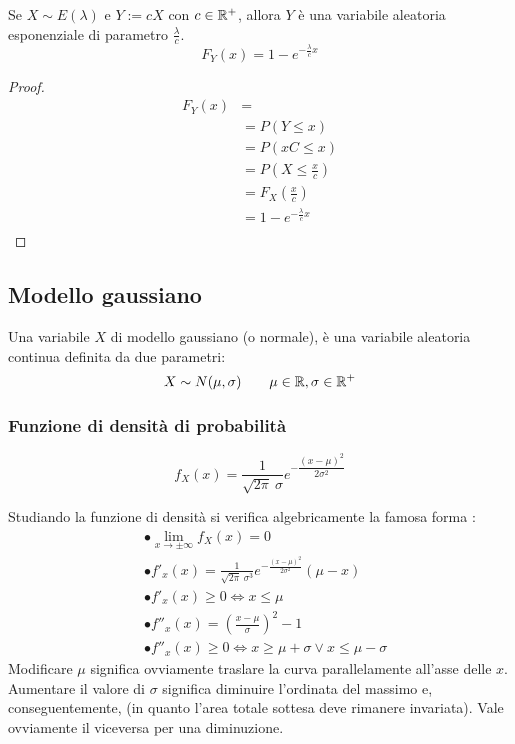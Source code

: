 \begin{prop}
	Se $X\sim E(\lambda)$ e $Y:=cX$ con $c\in\mathbb R^+$, allora $Y$ è una variabile aleatoria esponenziale di parametro $\frac{\lambda}{c}$.
	\begin{equation*}
		F_Y(x) = 1 - e^{-\frac{\lambda}{c} x}
	\end{equation*}
\end{prop}
\begin{proof}
	\begin{align*}
		F_Y(x) & =                                  \\
		       & = P(Y \leq x)                      \\
		       & = P(xC \leq x)                     \\
		       & = P\left(X \leq \frac{x}{c}\right) \\
		       & = F_X\left(\frac{x}{c}\right)      \\
		       & = 1 - e^{-\frac{\lambda}{c} x}     \\
	\end{align*}
\end{proof}


\subsection{Modello gaussiano}
Una variabile $X$ di modello gaussiano (o normale), è una variabile aleatoria continua definita da due parametri:
\begin{equation*}
	X\sim N(\mu, \sigma)\qquad \mu\in\mathbb R,\sigma\in\mathbb R^+
\end{equation*}


\subsubsection{Funzione di densità di probabilità}
\begin{equation*}
	f_X(x) = \frac{1}{\sqrt{2\pi}~\sigma}e^{-\dfrac{(x-\mu)^2}{2\sigma^2}}
\end{equation*}

Studiando la funzione di densità si verifica algebricamente la famosa forma :
\begin{align*}
	 & \bullet \lim_{x\to\pm\infty} f_X(x) = 0                                                 \\
	 & \bullet f'_x(x) = \frac{1}{\sqrt{2\pi}~\sigma^3}e^{-\frac{(x-\mu)^2}{2\sigma^2}}(\mu-x) \\
	 & \bullet f'_x(x) \geq 0 \Leftrightarrow x\leq\mu                                         \\
	 & \bullet f''_x(x) = \left(\frac{x-\mu}{\sigma}\right)^2 - 1                              \\
	 & \bullet f''_x(x) \geq 0 \Leftrightarrow x\geq \mu+\sigma \lor x\leq \mu-\sigma
\end{align*}
Modificare $\mu$ significa ovviamente traslare la curva parallelamente all'asse delle $x$. Aumentare il valore di $\sigma$ significa diminuire l'ordinata del massimo e, conseguentemente,  (in quanto l'area totale sottesa deve rimanere invariata). Vale ovviamente il viceversa per una diminuzione.

